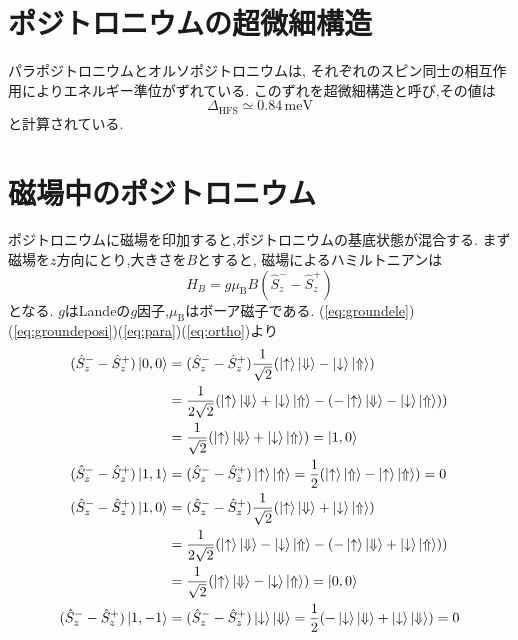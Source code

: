 \section{ポジトロニウムの超微細構造}

パラポジトロニウムとオルソポジトロニウムは,
それぞれのスピン同士の相互作用によりエネルギー準位がずれている.
このずれを超微細構造と呼び,その値は
\begin{equation}
	\nonumber
\Delta_{\mathrm{HFS}} \simeq 0.84 \, \mathrm{meV}
\end{equation}
と計算されている.


\section{磁場中のポジトロニウム}
ポジトロニウムに磁場を印加すると,ポジトロニウムの基底状態が混合する.
まず磁場を$z$方向にとり,大きさを$B$とすると,
磁場によるハミルトニアンは
\begin{equation}
	\nonumber
	\hat{H}_{B} = g\mu_{\mathrm{B}}B(\hat{S}^{-}_{z} - \hat{S}^{+}_{z})
\end{equation}
となる.
$g$はLandeの$g$因子,$\mu_{\mathrm{B}}$はボーア磁子である.%
(\ref{eq:groundele})(\ref{eq:groundeposi})(\ref{eq:para})(\ref{eq:ortho})より
\begin{align}
	\nonumber
(\hat{S}^{-}_{z} - \hat{S}^{+}_{z})\ket{0,0} &= (\hat{S}^{-}_{z} - \hat{S}^{+}_{z})\frac{1}{\sqrt{2}} ( \ket{ \uparrow } \ket{ \Downarrow } - \ket{ \downarrow } \ket{ \Uparrow }) \notag \\
&= \frac{1}{2\sqrt{2}} ( \ket{ \uparrow } \ket{ \Downarrow } + \ket{ \downarrow } \ket{ \Uparrow } - ( - \ket{ \uparrow } \ket{ \Downarrow } - \ket{ \downarrow } \ket{ \Uparrow } )) \notag \\
&= \frac{1}{\sqrt{2}} ( \ket{ \uparrow } \ket{ \Downarrow } + \ket{ \downarrow } \ket{ \Uparrow }) = \ket{1,0} \\
(\hat{S}^{-}_{z} - \hat{S}^{+}_{z})\ket{1,1}
&= (\hat{S}^{-}_{z} - \hat{S}^{+}_{z})\ket{ \uparrow } \ket{ \Uparrow }
=\frac{1}{2}( \ket{ \uparrow } \ket{ \Uparrow } - \ket{ \uparrow } \ket{ \Uparrow } )
= 0 \\
(\hat{S}^{-}_{z} - \hat{S}^{+}_{z})\ket{1,0} &= (\hat{S}^{-}_{z} - \hat{S}^{+}_{z})\frac{1}{\sqrt{2}} ( \ket{ \uparrow } \ket{ \Downarrow } + \ket{ \downarrow } \ket{ \Uparrow }) \notag \\
&= \frac{1}{2\sqrt{2}} ( \ket{ \uparrow } \ket{ \Downarrow } - \ket{ \downarrow } \ket{ \Uparrow } - ( - \ket{ \uparrow } \ket{ \Downarrow } + \ket{ \downarrow } \ket{ \Uparrow } )) \notag \\
&= \frac{1}{\sqrt{2}} ( \ket{ \uparrow } \ket{ \Downarrow } - \ket{ \downarrow } \ket{ \Uparrow }) = \ket{0,0} \\
(\hat{S}^{-}_{z} - \hat{S}^{+}_{z})\ket{1,-1}
&= (\hat{S}^{-}_{z} - \hat{S}^{+}_{z})\ket{ \downarrow } \ket{ \Downarrow }
=\frac{1}{2}( - \ket{ \downarrow } \ket{ \Downarrow } + \ket{ \downarrow } \ket{ \Downarrow } )
= 0
\end{align}

